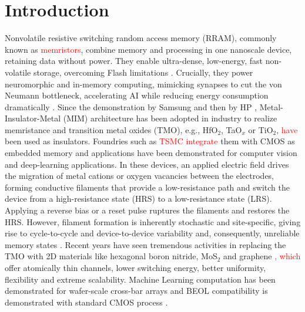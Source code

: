 \documentclass[aip,apl,reprint,floatfix]{revtex4-2}
\newcommand{\changed}[1]{\textcolor{red}{#1}}
\begin{document}
\section{Introduction}
Nonvolatile resistive switching random access memory (RRAM), commonly known as \changed{memristors}, combine memory and processing in one nanoscale device, retaining data without power. They enable ultra-dense, low-energy, fast non-volatile storage, overcoming Flash limitations \cite{6193402}. Crucially, they power neuromorphic and in-memory computing, mimicking synapses to cut the von Neumann bottleneck, accelerating AI while reducing energy consumption dramatically \cite{Yang2013Memristive}. Since the demonstration by Samsung \cite{1419232} and then by HP \cite{Strukov2008}, Metal-Insulator-Metal (MIM) architecture has been adopted in industry to realize memristance and transition metal oxides (TMO), e.g., HfO$_{2}$, TaO$_{x}$ or TiO$_{2}$, \changed{have} been used as insulators.  Foundries such as \changed{TSMC integrate} them with CMOS as embedded memory and applications have been demonstrated for computer vision and deep-learning applications\cite{TSMC}. In these devices, an applied electric field drives the migration of metal cations or oxygen vacancies between the electrodes, forming conductive filaments that provide a low-resistance path and switch the device from a high-resistance state (HRS) to a low-resistance state (LRS). Applying a reverse bias or a reset pulse ruptures the filaments and restores the HRS. However, filament formation is inherently stochastic and site-specific, giving rise to cycle-to-cycle and device-to-device variability and, consequently, unreliable memory states \cite{Roldan2023Variability}. Recent years have seen tremendous activities in replacing the TMO with 2D materials like hexagonal boron nitride\cite{Zhang2024Memristors}, MoS$_{2}$ \cite{MoS2} and graphene \cite{Standley}\changed{, which} offer atomically thin channels, lower switching energy, better uniformity, flexibility and extreme scalability.  Machine Learning computation has been  demonstrated for wafer-scale cross-bar arrays \cite{Tang2022WaferScale} and BEOL compatibility is demonstrated with standard CMOS process \cite{Shi2018Electronic}.
\end{document}
